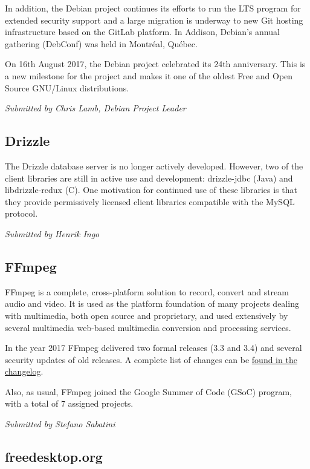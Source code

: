 \documentclass[a4paper]{report}
\begin{document}
In addition, the Debian project continues its efforts to run the LTS
program for extended security support and a large migration is underway
to new Git hosting infrastructure based on the GitLab platform. In
Addison, Debian's annual gathering (DebConf) was held in Montréal,
Québec.

On 16th August 2017, the Debian project celebrated its 24th anniversary.
This is a new milestone for the project and makes it one of the oldest
Free and Open Source GNU/Linux distributions.

{\em Submitted by Chris Lamb, Debian Project Leader}

\subsection{Drizzle}

The Drizzle database server is no longer actively developed. However,
two of the client libraries are still in active use and development:
drizzle-jdbc (Java) and libdrizzle-redux (C). One motivation for
continued use of these libraries is that they provide permissively
licensed client libraries compatible with the MySQL protocol.

{\em Submitted by Henrik Ingo}

\subsection{FFmpeg}

FFmpeg is a complete, cross-platform solution to record, convert and
stream audio and video. It is used as the platform foundation of many
projects dealing with multimedia, both open source and proprietary, and
used extensively by several multimedia web-based multimedia conversion
and processing services.

In the year 2017 FFmpeg delivered two formal releases (3.3 and 3.4) and
several security updates of old releases. A complete list of changes can
be \href{http://git.videolan.org/?p=ffmpeg.git;a=blob_plain;f=Changelog;hb=HEAD}{found
in the changelog}.

Also, as usual, FFmpeg joined the Google Summer of Code (GSoC) program,
with a total of 7 assigned projects.

{\em Submitted by Stefano Sabatini}

\subsection{freedesktop.org}
\end{document}
